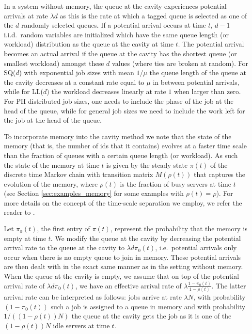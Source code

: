 \documentclass[12pt]{report}
\begin{document}
In a system without memory, the queue at the cavity experiences potential arrivals at rate $\lambda d$
as this is the rate at which a tagged queue is selected as one of the $d$ randomly selected queues. 
If  a potential arrival occurs at time $t$, $d-1$ i.i.d.~random variables are initialized which have the same queue length (or workload) distribution as the queue at the cavity at time $t$. The potential arrival becomes an actual arrival
if the queue at the cavity has the shortest queue (or smallest workload) amongst these $d$ values (where ties are broken at random).
For SQ($d$) with exponential job sizes with mean $1/\mu$ the queue length of the queue at the cavity decreases at a constant rate equal to $\mu$ in between potential arrivals, while for LL($d$) the workload
decreases linearly at rate $1$ when larger than zero. For PH distributed job sizes, one needs to include the phase of the job at the head of the queue, while for general job sizes we need to include the work left for the job at the head of the queue.

To incorporate memory into the cavity method we note that the state of the memory (that is, the number of ids that it contains) evolves at a faster time scale than the fraction of queues with a
certain queue length (or workload). As such the state of the memory at time $t$ is 
given by the steady state $\pi(t)$ of the discrete time Markov chain with transition
matrix $M(\rho(t))$ that captures the 
evolution of the memory, where $\rho(t)$ is the fraction of busy servers at time $t$
(see Section \ref{sec:examples_memory} for some examples with $\rho(t)=\rho$). For more details on the concept of the time-scale separation we employ, we refer the reader to \cite{benaim2008class}.

Let $\pi_0(t)$, the first entry of $\pi(t)$, represent the probability that the memory is empty at time $t$. 
We modify the queue at the cavity by decreasing the potential arrival rate to the queue at the cavity to $\lambda d \pi_0(t)$, i.e.~potential arrivals only occur when there is no empty queue to join in memory. These potential arrivals are then dealt with in the exact same manner as in the setting without memory. When the queue at the cavity is empty, we assume that on top of the potential arrival rate of $\lambda d \pi_0(t)$, we have an effective arrival rate of $\lambda \frac{1-\pi_0(t)}{1-\rho(t)}$. 
The latter arrival rate can be interpreted as follows: jobs arrive at rate $\lambda N$,
with probability $(1-\pi_0(t))$ such a job is assigned to a queue in memory and with
probability $1/((1-\rho(t))N)$ the queue at the cavity gets the job as it is one of
the $(1-\rho(t))N$ idle servers at time $t$.
\end{document}
